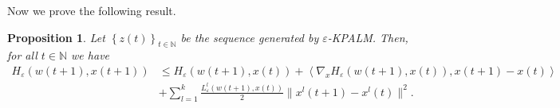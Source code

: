 \documentclass[11pt]{article}
\numberwithin{equation}{section}
\newtheorem{proposition}{Proposition}[section]
\begin{document}
Now we prove the following result.

\begin{proposition} \label{State_H_eps_prop}
Let $\left\lbrace z(t) \right\rbrace_{t \in \mathbb{N}}$ be the sequence generated by $\varepsilon$-KPALM. Then, for all $t \in \mathbb{N}$ we have
\begin{equation*}
\begin{aligned}
	H_{\varepsilon}(w(t+1),x(t+1)) 
	&\leq H_{\varepsilon}(w(t+1),x(t)) + \left\langle \nabla_x H_{\varepsilon}(w(t+1),x(t)), x(t+1)-x(t) \right\rangle \\
	&+ \sum\limits_{l=1}^{k} \frac{L^l_{\varepsilon}(w(t+1),x(t))}{2} \|x^l(t+1)-x^l(t)\|^2 .
\end{aligned}
\end{equation*}
\end{proposition}
\end{document}
